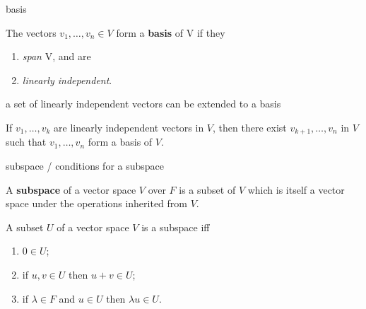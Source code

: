 \documentclass[avery5371,grid]{flashcards}
\newcommand{\defn}[1]{\textbf{#1}}
\begin{document}

\begin{flashcard}[Definition]{basis}

  The vectors $v_1, \ldots , v_n \in V$ form a \defn{basis} of V if
  they
  \begin{enumerate}
  \item \emph{span} V, and are
  \item \emph{linearly independent}.
  \end{enumerate}

\end{flashcard}

\begin{flashcard}[Theorem 2.4]{a set of linearly independent vectors
    can be extended to a basis}

  If $v_1, \ldots, v_k$ are linearly independent vectors in $V$, then
  there exist $v_{k+1}, \ldots, v_n$ in $V$ such that
  $v_1, \ldots, v_n$ form a basis of $V$.

\end{flashcard}

\begin{flashcard}{subspace / conditions for a subspace}

  A \defn{subspace} of a vector space $V$ over $F$ is a subset of $V$
  which is itself a vector space under the operations inherited from
  $V$.
  \vfill

  A subset $U$ of a vector space $V$ is a subspace iff
  \begin{enumerate}
  \item $0\in U$;
  \item if $u,v \in U$ then $u+v \in U$;
  \item if $\lambda \in F$ and $u \in U$ then $\lambda u \in U$.
  \end{enumerate}

\end{flashcard}
\end{document}
